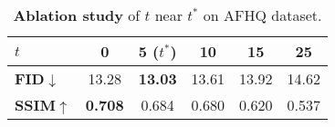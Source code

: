 \begin{table}[ht]
\small
\renewcommand\arraystretch{1}
\centering
\vspace{-8pt}
\caption{
    \textbf{Ablation study} of $t$ near $t^*$ on AFHQ dataset.
}
\label{tab:ablation_t_star_afhq}
\vspace{-10pt}
\begin{tabular}{l|ccccc}
\toprule
$t$ & 0 & 5 ($t^*$) & 10 & 15 & 25 \\
\midrule
\bf FID$\downarrow$ & 13.28 & \textbf{13.03} & 13.61  & 13.92  & 14.62  \\
\bf SSIM$\uparrow$  & \textbf{0.708} & 0.684 & 0.680  & 0.620  & 0.537  \\
\bottomrule
\end{tabular}
\end{table}